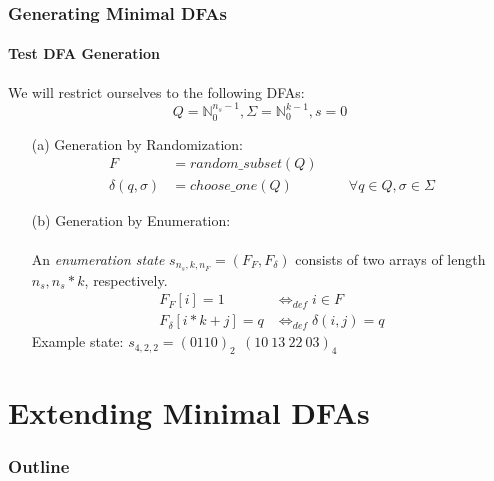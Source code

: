 \documentclass[10pt,usenames,dvipsnames]{beamer}%
\newcommand{\nSO}{{n_s}}
\newcommand{\nF}{{n_F}}
\newcommand{\kAL}{k}
\newcommand{\gregorColor}{violet}
\newcommand{\gregor}[1]{\textcolor{\gregorColor}{#1}}
\begin{document}
	\begin{frame}
		\frametitle{Generating Minimal DFAs}
		\framesubtitle{Test DFA Generation}
		We will restrict ourselves to the following DFAs:
		\[
			Q = \mathbb{N}_0^ {\nSO-1}, \Sigma = \mathbb{N}_0^{\kAL-1}, s = 0
		\]\pause
		
		\begin{enumerate}
			\item[(a)] Generation by Randomization:
			\begin{align*}
			F &= random\_subset(Q)\\
			\delta(q, \sigma) &= choose\_one(Q) \qquad\qquad \forall q\in Q, \sigma\in\Sigma
			\end{align*}\pause
			
			\item[(b)] Generation by Enumeration:\\$ $\\
			An \emph{enumeration state} $s_{\nSO, \kAL, \nF} = (F_F,F_\delta)$ consists of two arrays of length $\nSO, \nSO*\kAL$, respectively.
			\begin{align*}
			F_F[i] = 1 &\Leftrightarrow_{def} i \in F\\
			F_\delta[i * \kAL + j] = q &\Leftrightarrow_{def} \delta(i, j) = q
			\end{align*}
			Example state: $s_{4, 2, 2} = (0110)_2\ \ (10\ 13\ 22\ 03)_4$
		\end{enumerate}
	
	\end{frame}

%		
%	
	
	\section{Extending Minimal DFAs}
	
	\begin{frame}
		\frametitle{Outline}
		\tableofcontents[currentsection] %
	\end{frame}
	
	
\end{document}
